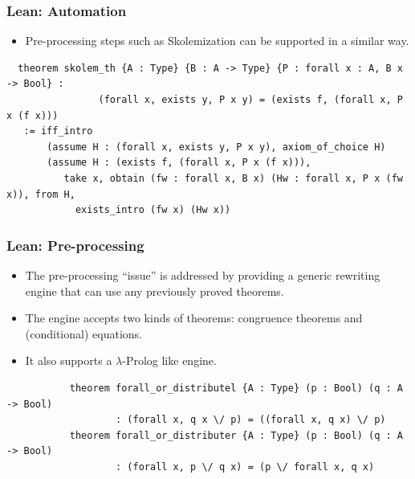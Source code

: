 \documentclass[svgnames,table,mathserif]{beamer}
\begin{document}
\begin{frame}[fragile]
\frametitle{Lean: Automation}
  \begin{itemize}
  \item Pre-processing steps such as Skolemization can be supported in
a similar way.
  \end{itemize}

{\scriptsize
\begin{verbatim}
  theorem skolem_th {A : Type} {B : A -> Type} {P : forall x : A, B x -> Bool} :
                (forall x, exists y, P x y) = (exists f, (forall x, P x (f x)))
   := iff_intro
       (assume H : (forall x, exists y, P x y), axiom_of_choice H)
       (assume H : (exists f, (forall x, P x (f x))),
          take x, obtain (fw : forall x, B x) (Hw : forall x, P x (fw x)), from H,
            exists_intro (fw x) (Hw x))
\end{verbatim}
}
\end{frame}

\begin{frame}[fragile]
\frametitle{Lean: Pre-processing}
  \begin{itemize}
     \item The pre-processing ``issue'' is addressed by providing a {\color{red} generic rewriting
engine} that can use any previously proved theorems.
     \item The engine accepts two kinds of theorems: {\color{red} congruence theorems} and {\color{red} (conditional)
equations}.
     \item It also supports a $\lambda$-Prolog like engine.
  \end{itemize}

{\tiny
\begin{verbatim}
           theorem forall_or_distributel {A : Type} (p : Bool) (q : A -> Bool)
                   : (forall x, q x \/ p) = ((forall x, q x) \/ p)
           theorem forall_or_distributer {A : Type} (p : Bool) (q : A -> Bool)
                   : (forall x, p \/ q x) = (p \/ forall x, q x)
\end{verbatim}
}

\end{frame}
\end{document}
